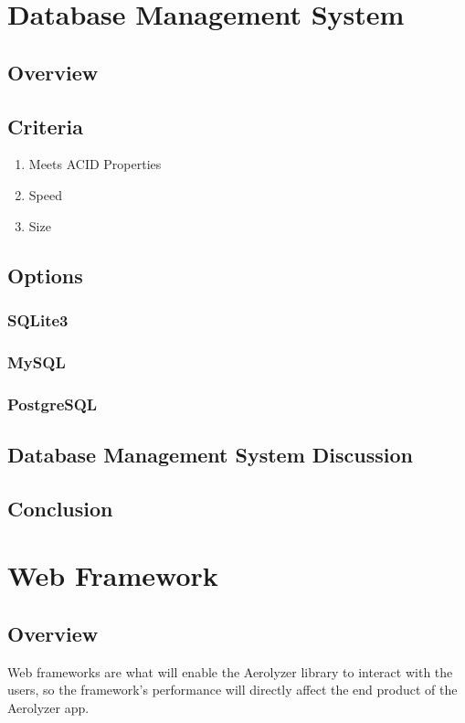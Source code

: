 \documentclass[onecolumn, draftclsnofoot,10pt, compsoc]{IEEEtran}
\begin{document}
\begin{singlespace}
\section{Database Management System}
\subsection{Overview}

\subsection{Criteria}
\begin{enumerate}
\item Meets ACID Properties
\item Speed
\item Size
\end{enumerate}
\subsection{Options}
\subsubsection{SQLite3}

\subsubsection{MySQL}

\subsubsection{PostgreSQL}

\subsection{Database Management System Discussion}

\subsection{Conclusion}


\section{Web Framework}
\subsection{Overview}
Web frameworks are what will enable the Aerolyzer library to interact with the users, so the framework's performance will directly affect the end product of the Aerolyzer app.

\end{singlespace}
\end{document}
